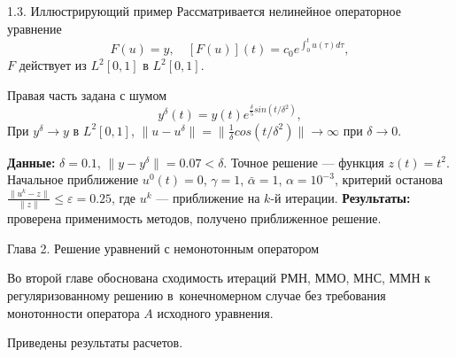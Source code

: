 \documentclass[10pt,pdf, mathserif, hyperref={unicode}]{beamer}
\begin{document}
\begin{frame}{1.3. Иллюстрирующий пример}
Рассматривается нелинейное операторное уравнение
	$$	F(u)=y, \quad [F(u)](t)=c_0 e^{\int_{0}^{t}u(\tau)d\tau},$$
	$F$ действует из $L^2[0,1]$ в $L^2[0,1]$. 

	
	Правая часть задана с шумом $$y^\delta(t)=y(t)e^{\frac{\delta}{5} sin(t/{\delta}^2)},$$
	При $y^\delta\to y$ в $L^2[0,1]$,  $\|u-u^\delta\|=\|\frac{1}{\delta}cos(t/{\delta}^2)\|\to\infty$ при $\delta\to 0$.
	\vskip 0.3cm

	{\textbf{\color{blue}Данные:}} $\delta=0.1$, $\|y-y^{\delta}\|=0.07<\delta$. Точное решение --- функция $z(t)=t^2$. 
	\vskip 1mm
	Начальное приближение $u^0(t)=0$, $\gamma=1$, $\bar\alpha=1$, $\alpha=10^{-3}$, критерий останова
	\vskip 1mm
	 $\frac{\|u^k-z\|}{\|z\|}\leqslant\varepsilon=0.25$, где $u^k$ --- приближение на $k$-й итерации.
	\vskip 0.3cm
	{\textbf{\color{blue}Результаты:}} проверена применимость методов, получено приближенное решение.	

	\let\thefootnote\relax\let\thefootnote\relax{}
\end{frame}

\begin{frame}{Глава 2. Решение уравнений с немонотонным оператором}
	
	Во второй главе обоснована сходимость итераций РМН, ММО, МНС, ММН к регуляризованному решению в~конечномерном случае без требования монотонности оператора $A$ исходного уравнения.
	
	\smallskip
	Приведены результаты расчетов.
\end{frame}
 
\end{document}
